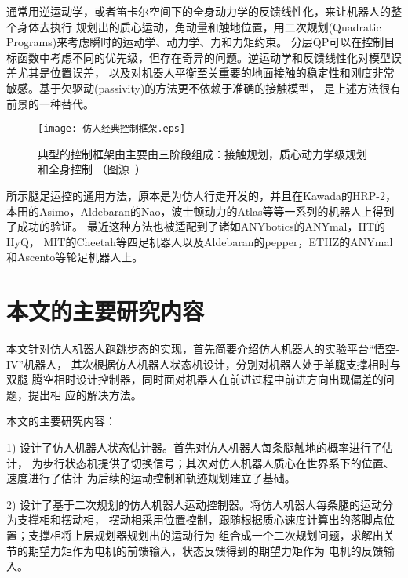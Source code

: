 通常用逆运动学\cite{kajita2003resolved}，或者笛卡尔空间下的全身动力学的反馈线性化\cite{wieber2000constrained}，来让机器人的整个身体去执行
规划出的质心运动，角动量和触地位置，用二次规划(Quadratic Programs)来考虑瞬时的运动学、动力学、力和力矩约束\cite{wieber2000constrained, kuindersma2014efficiently}。
分层QP可以在控制目标函数中考虑不同的优先级\cite{escande2014hierarchical}，但存在奇异的问题\cite{wieber2017geometric}。逆运动学和反馈线性化对模型误差尤其是位置误差，
以及对机器人平衡至关重要的地面接触的稳定性和刚度非常敏感。基于欠驱动(passivity)的方法更不依赖于准确的接触模型\cite{henze2016passivity, kurtz2020approximate}，
是上述方法很有前景的一种替代。
\begin{figure}[htbp]
    \centering
    \texttt{[image: 仿人经典控制框架.eps]}
    \caption{\label{fig:typical_control}典型的控制框架由主要由三阶段组成：接触规划，质心动力学级规划和全身控制
                （图源~\cite{carpentier2016center}）}
\end{figure}
所示腿足运控的通用方法，原本是为仿人行走开发的，并且在Kawada的HRP-2\cite{takenaka2009real}，
本田的Asimo\cite{takenaka2009real}，Aldebaran的Nao\cite{gouaillier2010omni}，波士顿动力的Atlas\cite{Kuindersma2020Recent}等等一系列的机器人上得到了成功的验证。
最近这种方法也被适配到了诸如ANYbotics的ANYmal\cite{bellicoso2018dynamic}，IIT的HyQ\cite{mastalli2017trajectory}，
MIT的Cheetah\cite{di2018dynamic}等四足机器人以及Aldebaran的pepper\cite{lafaye2014linear}，ETHZ的ANYmal\cite{bjelonic2020rolling}
和Ascento\cite{klemm2020lqr}等轮足机器人上。

\section{本文的主要研究内容}
本文针对仿人机器人跑跳步态的实现，首先简要介绍仿人机器人的实验平台“悟空-IV”机器人，
其次根据仿人机器人状态机设计，分别对机器人处于单腿支撑相时与双腿
腾空相时设计控制器，同时面对机器人在前进过程中前进方向出现偏差的问题，提出相
应的解决方法。

本文的主要研究内容：

1) 设计了仿人机器人状态估计器。首先对仿人机器人每条腿触地的概率进行了估计，
为步行状态机提供了切换信号；其次对仿人机器人质心在世界系下的位置、速度进行了估计
为后续的运动控制和轨迹规划建立了基础。

2) 设计了基于二次规划的仿人机器人运动控制器。将仿人机器人每条腿的运动分为支撑相和摆动相，
摆动相采用位置控制，跟随根据质心速度计算出的落脚点位置；支撑相将上层规划器规划出的运动行为
组合成一个二次规划问题，求解出关节的期望力矩作为电机的前馈输入，状态反馈得到的期望力矩作为
电机的反馈输入。


